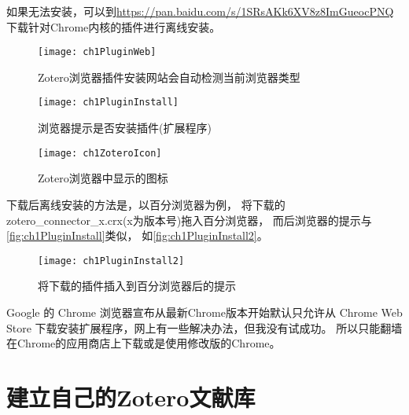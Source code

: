 \documentclass[cn,11pt,chinese]{elegantbook}
\begin{document}
		如果无法安装，可以到\href{https://pan.baidu.com/s/1SRsAKk6XV8z8ImGueocPNQ}
		{https://pan.baidu.com/s/1SRsAKk6XV8z8ImGueocPNQ}下载针对Chrome内核的插件进行离线安装。
		\begin{figure}[htbp]
			\centering
			\texttt{[image: ch1PluginWeb]}
			\caption{Zotero浏览器插件安装网站会自动检测当前浏览器类型}
			\label{fig:ch1PluginWeb}
		\end{figure}
		\begin{figure}[htbp]
			\centering
			\texttt{[image: ch1PluginInstall]}
			\caption{浏览器提示是否安装插件(扩展程序)}
			\label{fig:ch1PluginInstall}
		\end{figure}
		\begin{figure}[htbp]
			\centering
			\texttt{[image: ch1ZoteroIcon]}
			\caption{Zotero浏览器中显示的图标}
			\label{fig:ch1ZoteroIcon}
		\end{figure}
		
		下载后离线安装的方法是，以百分浏览器为例，
		将下载的zotero\_connector\_x.crx(x为版本号)拖入百分浏览器，
		而后浏览器的提示与\autoref{fig:ch1PluginInstall}类似，
		如\autoref{fig:ch1PluginInstall2}。
		\begin{figure}[htbp]
			\centering
			\texttt{[image: ch1PluginInstall2]}
			\caption{将下载的插件插入到百分浏览器后的提示}
			\label{fig:ch1PluginInstall2}
		\end{figure}
		
		Google 的 Chrome 浏览器宣布从最新Chrome版本开始默认只允许从 Chrome Web Store 
		下载安装扩展程序，网上有一些解决办法，但我没有试成功。
		所以只能翻墙在Chrome的应用商店上下载或是使用修改版的Chrome。

	\section{建立自己的Zotero文献库}\label{sec:newLibrary}
\end{document}

